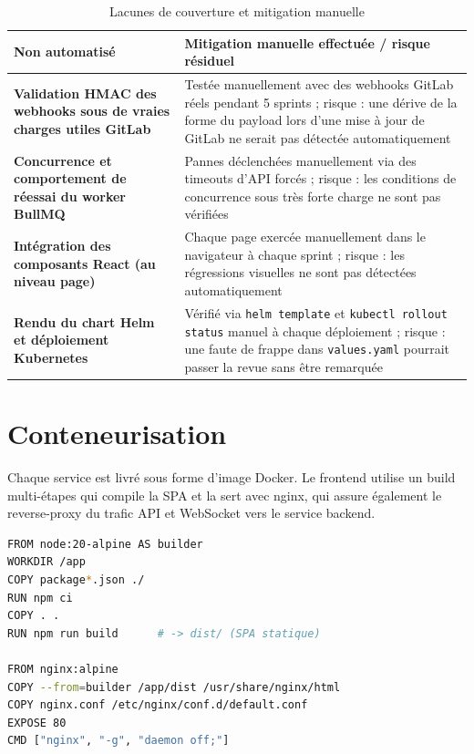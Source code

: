 \documentclass[12pt,a4paper,oneside]{report}
\begin{document}
\begin{table}[H]\centering
\caption{Lacunes de couverture et mitigation manuelle}\label{tab:coveragegaps}
\renewcommand{\arraystretch}{1.3}
\begin{tabularx}{\textwidth}{>{\bfseries\color{primary}}p{3.6cm} Y}
\toprule
{} Non automatisé & Mitigation manuelle effectuée / risque résiduel \\
\midrule
Validation HMAC des webhooks sous de vraies charges utiles GitLab & Testée manuellement avec des webhooks GitLab réels pendant 5 sprints ; risque : une dérive de la forme du payload lors d'une mise à jour de GitLab ne serait pas détectée automatiquement \\
Concurrence et comportement de réessai du worker BullMQ & Pannes déclenchées manuellement via des timeouts d'API forcés ; risque : les conditions de concurrence sous très forte charge ne sont pas vérifiées \\
Intégration des composants React (au niveau page) & Chaque page exercée manuellement dans le navigateur à chaque sprint ; risque : les régressions visuelles ne sont pas détectées automatiquement \\
Rendu du chart Helm et déploiement Kubernetes & Vérifié via \texttt{helm template} et \texttt{kubectl rollout status} manuel à chaque déploiement ; risque : une faute de frappe dans \texttt{values.yaml} pourrait passer la revue sans être remarquée \\
\bottomrule
\end{tabularx}
\end{table}

\section{Conteneurisation}
Chaque service est livré sous forme d'image Docker. Le frontend utilise un build multi-étapes qui compile la SPA et la sert avec nginx, qui assure également le reverse-proxy du trafic API et WebSocket vers le service backend.

\begin{lstlisting}[style=custom,language=bash,caption={Dockerfile multi-étapes du frontend},label={lst:dockerfile}]
FROM node:20-alpine AS builder
WORKDIR /app
COPY package*.json ./
RUN npm ci
COPY . .
RUN npm run build      # -> dist/ (SPA statique)

FROM nginx:alpine
COPY --from=builder /app/dist /usr/share/nginx/html
COPY nginx.conf /etc/nginx/conf.d/default.conf
EXPOSE 80
CMD ["nginx", "-g", "daemon off;"]
\end{lstlisting}
\end{document}
